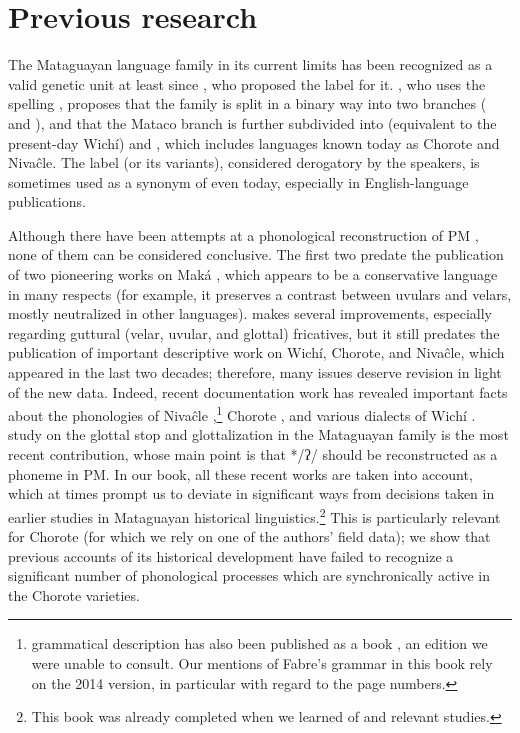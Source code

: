 \section{Previous research} \label{intro-previous}

The Mataguayan language family in its current limits has been recognized as a valid genetic unit at least since \citet{AM42}, who proposed the label  for it. \citet[202--204]{JAM50}, who uses the spelling , proposes that the family is split in a binary way into two branches ( and ), and that the Mataco branch is further subdivided into  (equivalent to the present-day Wichí) and , which includes languages known today as Chorote and Nivaĉle. The label  (or its variants), considered derogatory by the speakers, is sometimes used as a synonym of  even today, especially in English-language publications.

Although there have been attempts at a phonological reconstruction of PM \citep{EN84,PVB93,PVB02}, none of them can be considered conclusive. The first two predate the publication of two pioneering works on Maká \citep{AG94,AG99}, which appears to be a conservative language in many respects (for example, it preserves a contrast between uvulars and velars, mostly neutralized in other languages). \citet{PVB02} makes several improvements, especially regarding guttural (velar, uvular, and glottal) fricatives, but it still predates the publication of important descriptive work on Wichí, Chorote, and Nivaĉle, which appeared in the last two decades; therefore, many issues deserve revision in light of the new data. Indeed, recent documentation work has revealed important facts about the phonologies of Nivaĉle \citep{AF16,AnG15,AnG16,AnG16c,AnG16b,AnG19-L,AnG19,AnG21,LC20},\footnote{ grammatical description has also been published as a book \citep{AF16-libro}, an edition we were unable to consult. Our mentions of Fabre’s grammar in this book rely on the 2014 version, in particular with regard to the page numbers.} Chorote \citep{JC14b,JC14a,JC18}, and various dialects of Wichí \citep{AFG067,SS07,MA08,AFG-MC-09,JT09-th,VN14}.  study on the glottal stop and glottalization in the Mataguayan family is the most recent contribution, whose main point is that */ʔ/ should be reconstructed as a phoneme in PM. In our book, all these recent works are taken into account, which at times prompt us to deviate in significant ways from decisions taken in earlier studies in Mataguayan historical linguistics.\footnote{This book was already completed when we learned of  and  relevant studies.} This is particularly relevant for Chorote (for which we rely on one of the authors’ field data); we show that previous accounts of its historical development have failed to recognize a significant number of phonological processes which are synchronically active in the Chorote varieties.

